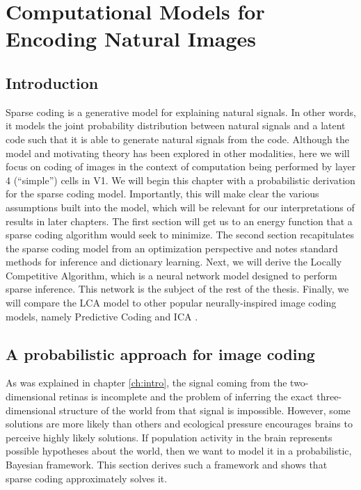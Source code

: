 \chapter{Computational Models for Encoding Natural Images}

\section{Introduction}
Sparse coding is a generative model for explaining natural signals. In other words, it models the joint probability distribution between natural signals and a latent code such that it is able to generate natural signals from the code. Although the model and motivating theory has been explored in other modalities, here we will focus on coding of images in the context of computation being performed by layer 4 (``simple'') cells in V1. We will begin this chapter with a probabilistic derivation for the sparse coding model. Importantly, this will make clear the various assumptions built into the model, which will be relevant for our interpretations of results in later chapters. The first section will get us to an energy function that a sparse coding algorithm would seek to minimize. The second section recapitulates the sparse coding model from an optimization perspective and notes standard methods for inference and dictionary learning. Next, we will derive the Locally Competitive Algorithm, which is a neural network model designed to perform sparse inference. This network is the subject of the rest of the thesis. Finally, we will compare the LCA model to other popular neurally-inspired image coding models, namely Predictive Coding \parencite{rao1999predictive} and ICA \parencite{bell1997independent}.

\section{A probabilistic approach for image coding}
As was explained in chapter \ref{ch:intro}, the signal coming from the two-dimensional retinas is incomplete and the problem of inferring the exact three-dimensional structure of the world from that signal is impossible. However, some solutions are more likely than others and ecological pressure encourages brains to perceive highly likely solutions. If population activity in the brain represents possible hypotheses about the world, then we want to model it in a probabilistic, Bayesian framework. This section derives such a framework and shows that sparse coding approximately solves it.

